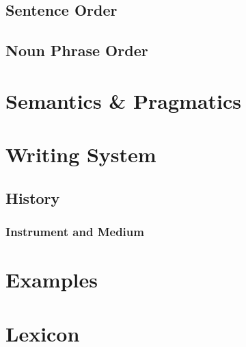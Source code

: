 \documentclass{clgrammar}
\begin{document}
\section{Sentence Order}

\section{Noun Phrase Order}

\chapter{Semantics \& Pragmatics}

\chapter{Writing System}

\section{History}

\subsection{Instrument and Medium}

\chapter{Examples}

\chapter{Lexicon}
\end{document}
